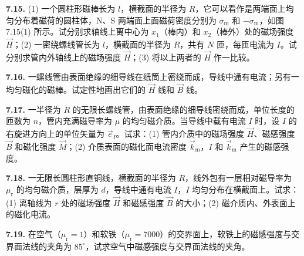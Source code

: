 \begin{center}
  \begin{minipage}[b]{0.47\linewidth}
    \centering
  \end{minipage}\hfill
  \begin{minipage}[b]{0.47\linewidth}
    \centering
  \end{minipage}
\end{center}

\vfill
\newpage

\textbf{7.15.} (1) 一个圆柱形磁棒长为 $l$，横截面的半径为 $R$，它可以看作是两端面上均匀分布着磁荷的圆柱体，N、S 两端面上面磁荷密度分别为 $\sigma_{\mathrm{m}}$ 和 $-\sigma_{\mathrm{m}}$，如图 7.15(1) 所示。试分别求轴线上离中心为 $x_1$（棒内）和 $x_2$（棒外）处的磁场强度 $\vec{H}$；(2) 一密绕螺线管长为 $l$，横截面的半径为 $R$，共有 $N$ 匝，每匝电流为 $I$。试分别求管内外轴线上的磁场强度 $\vec{H}$；(3) 将以上两者的 $\vec{H}$ 作一比较。

\begin{center}
\end{center}

\vfill
\newpage

\textbf{7.16.} 一螺线管由表面绝缘的细导线在纸筒上密绕而成，导线中通有电流；另有一均匀磁化的磁棒。试定性地画出它们的 $\vec{H}$ 线和 $\vec{B}$ 线。

\vfill
\newpage

\textbf{7.17.} 一半径为 $R$ 的无限长螺线管，由表面绝缘的细导线密绕而成，单位长度的匝数为 $n$，管内充满磁导率为 $\mu$ 的均匀磁介质。当导线中载有电流 $I$ 时，设 $I$ 的右旋进方向上的单位矢量为 $\vec{e}_I$。试求：(1) 管内介质中的磁场强度 $\vec{H}$、磁感强度 $\vec{B}$ 和磁化强度 $\vec{M}$；(2) 介质表面的磁化面电流密度 $\vec{k}_{\mathrm{m}}$，$I$ 和 $\vec{k}_{\mathrm{m}}$ 产生的磁感强度。

\vfill
\newpage

\textbf{7.18.} 一无限长圆柱形直铜线，横截面的半径为 $R$，线外包有一层相对磁导率为 $\mu_{\mathrm{r}}$ 的均匀磁介质，层厚为 $d$，导线中通有电流 $I$，$I$ 均匀分布在横截面上。试求：(1) 离轴线为 $r$ 处的磁场强度 $\vec{H}$ 和磁感强度 $\vec{B}$ 的大小；(2) 磁介质内、外表面上的磁化电流。

\vfill
\newpage

\textbf{7.19.} 在空气（$\mu_{\mathrm{r}} = 1$）和软铁（$\mu_{\mathrm{r}} = 7000$）的交界面上，软铁上的磁感强度与交界面法线的夹角为 $85^{\circ}$，试求空气中磁感强度与交界面法线的夹角。

